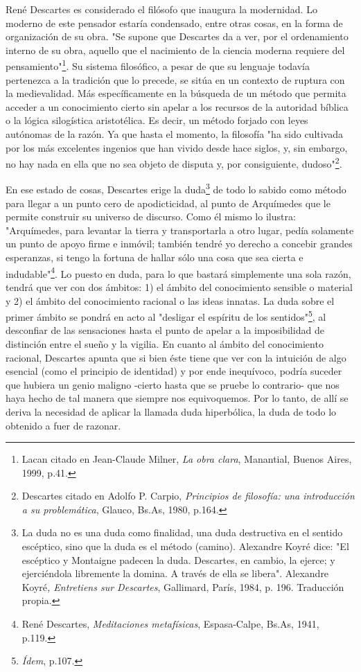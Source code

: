 \documentclass{book}
\begin{document}
René Descartes es considerado el filósofo que inaugura la modernidad. Lo
moderno de este pensador estaría condensado, entre otras cosas, en la
forma de organización de su obra. "Se supone que Descartes da a ver, por
el ordenamiento interno de su obra, aquello que el nacimiento de la
ciencia moderna requiere del pensamiento"\footnote{Lacan citado en
  Jean-Claude Milner, \emph{La obra clara}, Manantial, Buenos Aires,
  1999, p.41.}. Su sistema filosófico, a pesar de que su lenguaje
todavía pertenezca a la tradición que lo precede, se sitúa en un
contexto de ruptura con la medievalidad. Más específicamente en la
búsqueda de un método que permita acceder a un conocimiento cierto sin
apelar a los recursos de la autoridad bíblica o la lógica silogística
aristotélica. Es decir, un método forjado con leyes autónomas de la
razón. Ya que hasta el momento, la filosofía "ha sido cultivada por los
más excelentes ingenios que han vivido desde hace siglos, y, sin
embargo, no hay nada en ella que no sea objeto de disputa y, por
consiguiente, dudoso"\footnote{Descartes citado en Adolfo P. Carpio,
  \emph{Principios de filosofía: una introducción a su problemática},
  Glauco, Bs.As, 1980, p.164.}.

En ese estado de cosas, Descartes erige la duda\footnote{La duda no es
  una duda como finalidad, una duda destructiva en el sentido escéptico,
  sino que la duda es el método (camino). Alexandre Koyré dice: "El
  escéptico y Montaigne padecen la duda. Descartes, en cambio, la
  ejerce; y ejerciéndola libremente la domina. A través de ella se
  libera". Alexandre Koyré\emph{, Entretiens sur Descartes}, Gallimard,
  París, 1984, p. 196. Traducción propia.} de todo lo sabido como método
para llegar a un punto cero de apodicticidad, al punto de Arquímedes que
le permite construir su universo de discurso. Como él mismo lo ilustra:
"Arquímedes, para levantar la tierra y transportarla a otro lugar, pedía
solamente un punto de apoyo firme e inmóvil; también tendré yo derecho a
concebir grandes esperanzas, si tengo la fortuna de hallar sólo una cosa
que sea cierta e indudable"\footnote{René Descartes, \emph{Meditaciones
  metafísicas}, Espasa-Calpe, Bs.As, 1941, p.119.}. Lo puesto en duda,
para lo que bastará simplemente una sola razón, tendrá que ver con dos
ámbitos: 1) el ámbito del conocimiento sensible o material y 2) el
ámbito del conocimiento racional o las ideas innatas. La duda sobre el
primer ámbito se pondrá en acto al "desligar el espíritu de los
sentidos"\footnote{\emph{Ídem}, p.107.}, al desconfiar de las
sensaciones hasta el punto de apelar a la imposibilidad de distinción
entre el sueño y la vigilia. En cuanto al ámbito del conocimiento
racional, Descartes apunta que si bien éste tiene que ver con la
intuición de algo esencial (como el principio de identidad) y por ende
inequívoco, podría suceder que hubiera un genio maligno -cierto hasta
que se pruebe lo contrario- que nos haya hecho de tal manera que siempre
nos equivoquemos. Por lo tanto, de allí se deriva la necesidad de
aplicar la llamada duda hiperbólica, la duda de todo lo obtenido a fuer
de razonar.
\end{document}
